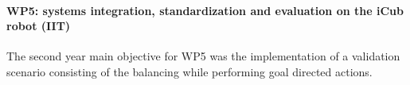 \paragraph{WP5: systems integration, standardization and evaluation on the iCub robot (IIT)}

The second year main objective for WP5 was the implementation of a validation scenario consisting of the balancing while performing goal directed actions. 
